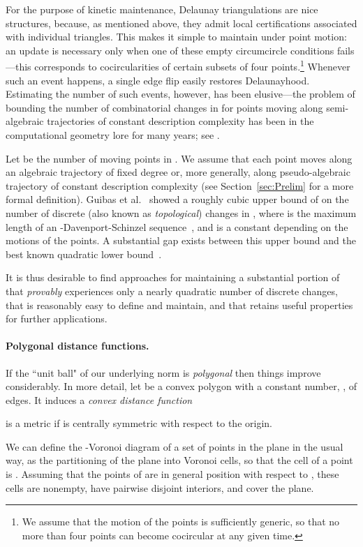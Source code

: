 \documentclass[letter,11pt]{article}
\begin{document}
For the purpose of kinetic maintenance, Delaunay triangulations are 
nice structures, because, as mentioned above, they admit local 
certifications associated with individual triangles.  This makes 
it simple to maintain  under point motion: an update is 
necessary only when one of these empty circumcircle conditions 
fails---this corresponds to cocircularities of certain subsets of
four points.\footnote{We assume that the motion of the points is sufficiently generic, so that no more than four points can become cocircular at any given time.} Whenever such an event happens, 
a single edge flip easily restores Delaunayhood. Estimating the 
number of such events, however, has been elusive---the problem 
of bounding the number of combinatorial changes in  for 
points moving along semi-algebraic trajectories of constant description complexity has been in the 
computational geometry lore for many years; see \cite{TOPP}.

Let  be the number of moving points in . We
assume that each point moves along an algebraic trajectory of
fixed degree or, more generally, along pseudo-algebraic trajectory of constant description complexity (see Section~\ref{sec:Prelim} for a more formal
definition).
Guibas et al.~\cite{gmr-vdmpp-92} showed a roughly cubic upper bound of
 on the number of discrete (also known as \textit{topological}) changes in , where  is the maximum length
of an -Davenport-Schinzel sequence~\cite{SA95}, and  is a constant
depending on the motions of the points. A substantial gap exists between this upper bound
and the best known quadratic lower bound~\cite{SA95}. 


It is thus desirable to find approaches for maintaining a substantial 
portion of  that {\em provably} experiences only a nearly 
quadratic number of discrete changes, that is reasonably easy to define and 
maintain, and that retains useful properties for further applications.

\paragraph{Polygonal distance functions.} 
If the ``unit ball" of our
underlying norm is {\em polygonal} then things improve considerably.
In more detail, let  be a convex polygon with a constant
number, , of edges.  It induces a {\em convex distance function}
 
 is a metric if  is centrally symmetric with respect to the origin.

We can define the -Voronoi diagram
of a set  of points in the plane in the usual way, as the
partitioning of the plane into Voronoi cells, so that the cell
 of a point  is
.
Assuming that the points of  are in general position with respect
to , these cells are nonempty, have pairwise disjoint interiors,
and cover the plane. 
\end{document}
